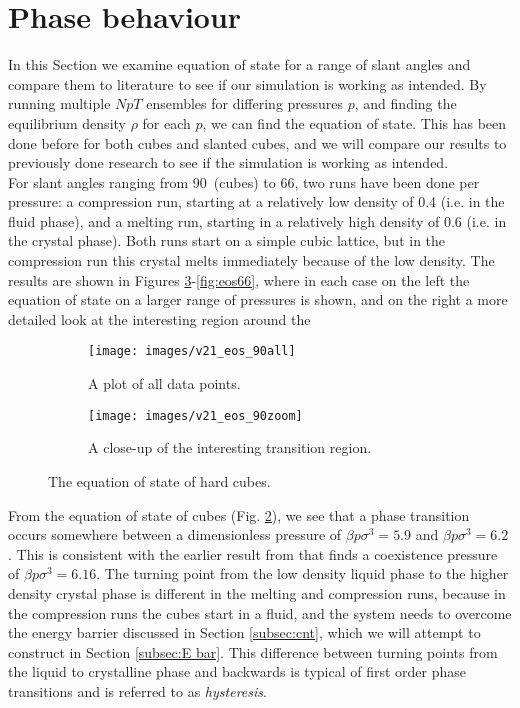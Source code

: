 \documentclass[thesis]{subfiles}
\begin{document}
\section{Phase behaviour}\label{subsec:eos}

In this Section we examine equation of state for a range of slant angles and compare them to literature to see if our simulation is working as intended. By running multiple $NpT$ ensembles for differing pressures $p$, and finding the equilibrium density $\rho$ for each $p$, we can find the equation of state. This has been done before for both cubes and slanted cubes\cite{van2017phase}, and we will compare our results to previously done research to see if the simulation is working as intended.\\

For slant angles ranging from 90\degr\ (cubes) to 66\degr, two runs have been done per pressure: a compression run, starting at a relatively low density of 0.4 (i.e. in the fluid phase), and a melting run, starting in a relatively high density of 0.6 (i.e. in the crystal phase). Both runs start on a simple cubic lattice, but in the compression run this crystal melts immediately because of the low density. The results are shown in Figures \ref{fig:eos90}-\ref{fig:eos66}, where in each case on the left the equation of state on a larger range of pressures is shown, and on the right a more detailed look at the interesting region around the 

\begin{figure}[h]
	\begin{subfigure}[t]{0.475\textwidth}
		\texttt{[image: images/v21\_eos\_90all]}
		\caption{A plot of all data points.}
		\label{fig:eos90-a}
	\end{subfigure}\hfill
	\begin{subfigure}[t]{0.475\textwidth}
		\texttt{[image: images/v21\_eos\_90zoom]}
		\caption{A close-up of the interesting transition region.}
		\label{fig:eos90-b}
	\end{subfigure}
	\caption{The equation of state of hard cubes.}
	\label{fig:eos90}
\end{figure}

From the equation of state of cubes (Fig. \ref{fig:eos90-b}), we see that a phase transition occurs somewhere between a dimensionless pressure of $\beta p \sigma^3 = 5.9$ and $\beta p \sigma^3 = 6.2$. This is consistent with the earlier result from \cite{smallenburg2012vacancy} that finds a coexistence pressure of $\beta p \sigma^3 = 6.16$. The turning point from the low density liquid phase to the higher density crystal phase is different in the melting and compression runs, because in the compression runs the cubes start in a fluid, and the system needs to overcome the energy barrier discussed in Section \ref{subsec:cnt}, which we will attempt to construct in Section \ref{subsec:E bar}. This difference between turning points from the liquid to crystalline phase and backwards is typical of first order phase transitions and is referred to as \emph{hysteresis}.\\
\end{document}
